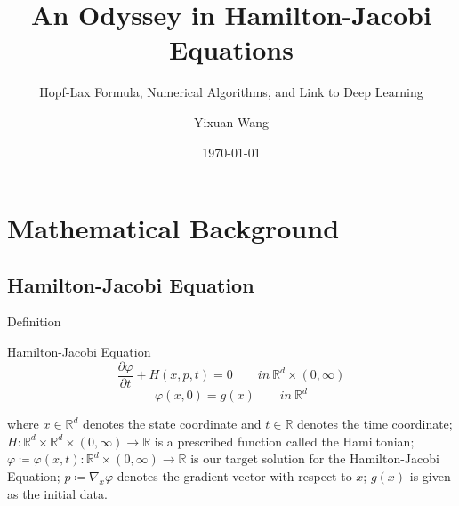 \documentclass[english]{pkuslide}
\title[Dynamic Systems \& Deep Learning]{An Odyssey in Hamilton-Jacobi Equations}
\subtitle{Hopf-Lax Formula, Numerical Algorithms, and Link to Deep Learning}
\institute{Peking University}
\author{Yixuan Wang}
\date{\today}
\begin{document}
	\begin{frame}
\titlepage
	\end{frame}

	\begin{frame}
\tableofcontents[subsectionstyle=show]
	\end{frame}

\section{Mathematical Background}
\frame{\sectionpage}
\subsection{Hamilton-Jacobi Equation}

	\begin{frame}{Definition}
\begin{alertblock}{Hamilton-Jacobi Equation}
\begin{equation}
\frac{\partial \varphi}{\partial t} + H(x,p,t) = 0  \qquad in\  \mathbb{R}^{d} \times (0,\infty) 
\end{equation}
\begin{equation}
\varphi(x,0) = g(x)  \qquad in\  \mathbb{R}^{d}
\end{equation}

\end{alertblock}
where \begin{math} x \in \mathbb{R}^{d}\end{math} denotes the state coordinate and \begin{math}t \in \mathbb{R} \end{math} denotes the time coordinate; \begin{math} H :  \mathbb{R}^{d} \times \mathbb{R}^{d} \times (0,\infty) \to \mathbb{R} \end{math} is a prescribed function called the Hamiltonian;  \begin{math} \varphi \coloneqq \varphi(x,t) : \mathbb{R}^{d} \times (0,\infty) \to \mathbb{R}  \end{math} is our target solution for the Hamilton-Jacobi Equation; \begin{math} p \coloneqq \nabla _{x}{\varphi} \end{math} denotes the gradient vector with respect to $x$; $g(x)$ is given as the initial data.
	\end{frame}
\end{document}
